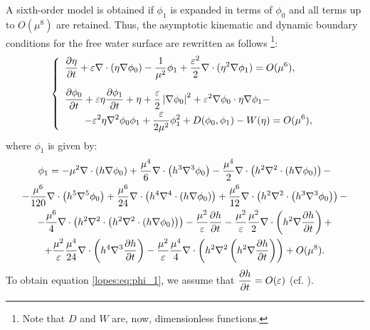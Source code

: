 A sixth-order model is obtained if 
 \(\phi_1\) is expanded in terms of \(\phi_0\) and all terms
up to \(O(\mu^8)\) are retained. 
Thus,  the asymptotic kinematic and dynamic
boundary conditions for the free water surface  are
rewritten as
 follows \footnote{Note that \(D\)
and \(W\) are, now,   dimensionless functions.}:
\begin{equation}\label{lopes:eq:kindyn}
\renewcommand{\arraystretch}{1.7}
\left\{\begin{array}{l}
\displaystyle\fpar{\eta}{t}+\varepsilon\nabla\cdot(\eta\nabla\phi_0)-\frac{1}{\mu^2}\phi_1+
\frac{\varepsilon^2}{2}\nabla\cdot(\eta^2\nabla\phi_1)=O(\mu^{6}),
\vspace{0.3cm} 
\\
\displaystyle \fpar{\phi_0}{t}+\varepsilon\eta\fpar{\phi_1}{t}+\eta +
\frac{\varepsilon}{2} \left|\nabla\phi_0\right|^2+\varepsilon^2\nabla\phi_0\cdot\eta\nabla\phi_1-\\
\displaystyle \qquad -\varepsilon^2\eta\nabla^2\phi_0\phi_1
+\frac{\varepsilon}{2\mu^2}\phi_1^2
+D(\phi_0,\phi_1)-W(\eta)
=O(\mu^{6}),
\end{array}\right .
\end{equation}
where \(\phi_1\) is given by:
\begin{multline}\label{lopes:eq:phi_1}
\phi_1=
-\mu^{2}\nabla\cdot\left(h\nabla\phi_0\right)
+\frac{\mu^{4}}{6}\nabla\cdot\left(h^3\nabla^3\phi_0\right)
-\frac{\mu^{4}}{2}\nabla\cdot\left(h^2
\nabla^2\cdot\left(h\nabla\phi_0\right) \right)-\\
-\frac{\mu^6}{120}\nabla\cdot\left(h^5\nabla^5\phi_0\right)+
\frac{\mu^6}{24}\nabla\cdot\left(h^4\nabla^4\cdot\left(h\nabla\phi_0\right)\right)+\frac{\mu^6}{12}\nabla\cdot\left(h^2\nabla^2\cdot\left(h^3\nabla^3\phi_0\right)\right)-\\
-\frac{\mu^6}{4}\nabla\cdot\left(h^2\nabla^2\cdot\left(h^2\nabla^2\cdot\left(h\nabla\phi_0\right)\right)\right)
-\frac{\mu^2}{\varepsilon}\frac{\partial h}{\partial t}-
\frac{\mu^2}{\varepsilon}\frac{\mu^2}{2}\nabla\cdot\left(h^2\nabla\frac{\partial h}{\partial t}\right)+\\
+\frac{\mu^2}{\varepsilon}\frac{\mu^4}{24}\nabla\cdot\left(h^4\nabla^3
\frac{\partial h}{\partial t}\right)
-\frac{\mu^2}{\varepsilon}\frac{\mu^4}{4}\nabla\cdot\left(h^2\nabla^2\left(h^2\nabla\frac{\partial h}{\partial t}\right)\right)+O(\mu^{8}).
\end{multline}
To obtain equation \eqref{lopes:eq:phi_1}, we assume
that \(\displaystyle\frac{\partial h}{\partial t}=O(\varepsilon)\) (cf. \cite{DutykhDias2007}).



